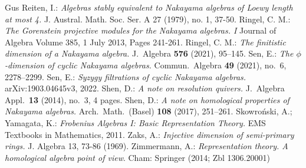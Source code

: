 \documentclass[a4paper]{amsart}
\theoremstyle{definition}
\theoremstyle{remark}
\numberwithin{equation}{theorem}
\begin{document}
\begin{thebibliography}{Gus}
 Reiten, I.: {\it Algebras stably equivalent to Nakayama algebras of Loewy length at most 4.} J. Austral. Math. Soc. Ser. A 27 (1979), no. 1, 37-50.
 Ringel, C. M.: {\it The Gorenstein projective modules for the Nakayama algebras. I} Journal of Algebra
Volume 385, 1 July 2013, Pages 241-261.
 Ringel, C. M.:
{\it The finitistic dimension of a Nakayama algebra.}
J.\ Algebra \textbf{576} (2021), 95--145.
 Sen, E.:
{\it The $ \phi $-dimension of cyclic Nakayama algebras.}
Commun.\ Algebra \textbf{49} (2021), no.\ 6, 2278--2299.
 Sen, E.:
{\it Syzygy filtrations of cyclic Nakayama algebras.}  arXiv:1903.04645v3, 2022.
 Shen, D.:
{\it A note on resolution quivers.}
J.\ Algebra Appl.\ \textbf{13} (2014), no.\ 3, 4 pages.
 Shen, D.:
{\it A note on homological properties of Nakayama algebras.}
Arch.\ Math.\ (Basel) \textbf{108} (2017), 251--261.
 Skowro\'nski, A.; Yamagata, K.: {\it Frobenius Algebras I: Basic Representation Theory.} EMS Textbooks in Mathematics, 2011.
 Zaks, A.: {\it  Injective dimension of semi-primary rings.} J. Algebra 13, 73-86 (1969).
 Zimmermann, A.: \textit{Representation theory. A homological algebra point of view}. Cham: Springer (2014; Zbl 1306.20001)
\end{thebibliography}
\end{document}
